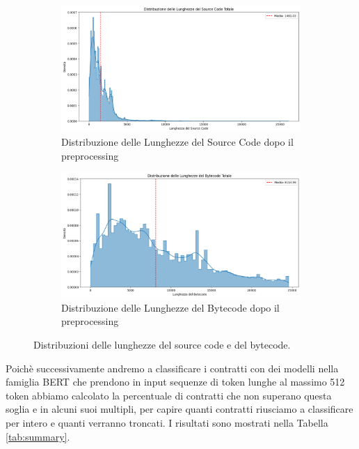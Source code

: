 \documentclass[../../Thesis.tex]{subfiles}
\begin{document}
\begin{figure}[htbp]
    \centering
    \begin{subfigure}[b]{0.49\textwidth}
        \centering
        \includegraphics[width=\textwidth]{../../img/SCTokensPreprocessed.png}
        \caption{Distribuzione delle Lunghezze del Source Code dopo il preprocessing}
        \label{fig:sourcecode_length_distribution}
    \end{subfigure}
    \hfill
    \begin{subfigure}[b]{0.49\textwidth}
        \centering
        \includegraphics[width=\textwidth]{../../img/BCTokensPreprocessed.png}
        \caption{Distribuzione delle Lunghezze del Bytecode dopo il preprocessing}
        \label{fig:bytecode_length_distribution}
    \end{subfigure}
    \caption{Distribuzioni delle lunghezze del source code e del bytecode.}
    \label{fig:length_distributions}
\end{figure}
Poichè successivamente andremo a classificare i contratti con dei modelli nella famiglia BERT che prendono in input sequenze di token lunghe al massimo 512 token abbiamo calcolato la percentuale di contratti che non superano questa soglia e in alcuni suoi multipli, per capire quanti contratti riusciamo a classificare per intero e quanti verranno troncati. I risultati sono mostrati nella Tabella \ref{tab:summary}.
\end{document}
